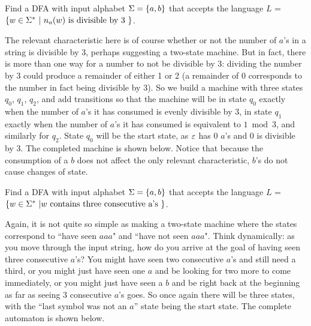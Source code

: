 \begin{example}
Find a DFA with input alphabet $\Sigma = \mbox{$\{a,b\}$}$ that accepts the language
$L$ = $\{w \in \Sigma^* \ | \  n_a(w)  \mbox{ is divisible by 3 } \}$.

The relevant characteristic here is of course whether or not the number of $a$'s
in a string is divisible by 3, perhaps suggesting a two-state machine.  But in
fact, there is more than one way for a number to not be divisible by 3: dividing
the number by 3 could produce a remainder of either 1 or 2 (a remainder of 0
corresponds to the number in fact being divisible by 3).  So we build a machine
with three states $q_0$, $q_1$, $q_2$, and add transitions so that the machine
will be in state $q_0$ exactly when the number of $a$'s it has consumed is evenly
divisible by 3, in state $q_1$ exactly when the number of $a$'s it has consumed
is equivalent to $ 1 \bmod{3}$, and similarly for $q_2$.  State $q_0$ will be the
start state, as $\varepsilon$ has 0 $a$'s and 0 is divisible by 3.  The completed
machine is shown below.  Notice that because the consumption of a $b$ does not
affect the only relevant characteristic, $b$'s do not cause changes of 
state.


\end{example}


\begin{example}
Find a DFA with input alphabet $\Sigma = \mbox{$\{a,b\}$}$ that accepts the language
$L$ = $\{w \in \Sigma^* \ | w \mbox{ contains three consecutive a's } \}$.

Again, it is not quite so simple as making a two-state machine where the states
correspond to ``have seen $aaa$" and ``have not seen $aaa$".
Think dynamically: as you move through the
input string, how do you arrive at the goal of having seen three consecutive
$a$'s?  You might have seen two consecutive $a$'s and still need a third, or
you might just have seen one $a$ and be looking for two more to come
immediately, or you might just have seen a $b$ and be right back at the
beginning as far as seeing 3 consecutive $a$'s goes.  So once again there will be
three states, with the ``last symbol was not an $a$'' state being the start
state.  The complete automaton is shown below.

\medskip
{}
\end{example}


